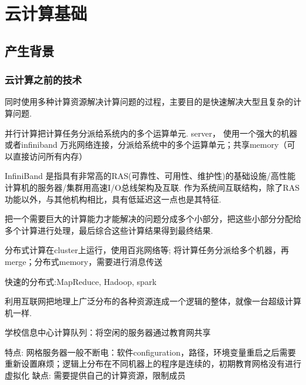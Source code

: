 \chapter{云计算基础}

\section{产生背景}

\subsection{云计算之前的技术}

\begin{definition}[并行计算]
    同时使用多种计算资源解决计算问题的过程，主要目的是快速解决大型且复杂的计算问题. 

\end{definition}

并行计算把计算任务分派给系统内的多个运算单元.  server， 使用一个强大的机器或者infiniband 万兆网络连接，分派给系统中的多个运算单元；共享memory（可以直接访问所有内存）

\begin{definition}[InfiniBand]
    InfiniBand 是指具有非常高的RAS(可靠性、可用性、维护性)的基础设施/高性能计算机的服务器/集群用高速I/O总线架构及互联. 作为系统间互联结构，除了RAS功能以外，与其他机构相比，具有低延迟这一点也是其特征. 
\end{definition}

\begin{definition}[分布式计算]
    把一个需要巨大的计算能力才能解决的问题分成多个小部分，把这些小部分分配给多个计算进行处理，最后综合这些计算结果得到最终结果. 
\end{definition}

分布式计算在cluster上运行，使用百兆网络等; 将计算任务分派给多个机器，再merge；分布式memory，需要进行消息传送

快速的分布式:MapReduce, Hadoop, spark

\begin{definition}[网格计算]
    利用互联网把地理上广泛分布的各种资源连成一个逻辑的整体，就像一台超级计算机一样. 
\end{definition}

\begin{example}[教育网格]
    学校信息中心计算队列：将空闲的服务器通过教育网共享

    特点: 网格服务器一般不断电：软件configuration，路径，环境变量重启之后需要重新设置麻烦；逻辑上分布在不同机器上的程序是连续的，初期教育网格没有进行虚拟化
    缺点: 需要提供自己的计算资源，限制成员
\end{example}

